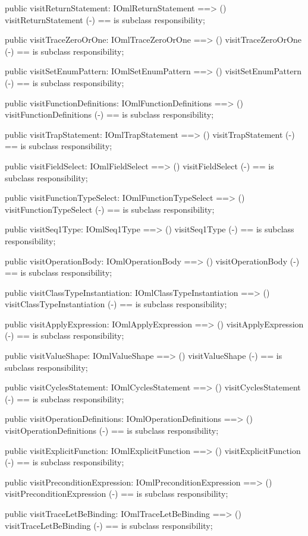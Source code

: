 \begin{vdm_al}
  public visitReturnStatement: IOmlReturnStatement ==> ()
  visitReturnStatement (-) == is subclass responsibility;

  public visitTraceZeroOrOne: IOmlTraceZeroOrOne ==> ()
  visitTraceZeroOrOne (-) == is subclass responsibility;

  public visitSetEnumPattern: IOmlSetEnumPattern ==> ()
  visitSetEnumPattern (-) == is subclass responsibility;

  public visitFunctionDefinitions: IOmlFunctionDefinitions ==> ()
  visitFunctionDefinitions (-) == is subclass responsibility;

  public visitTrapStatement: IOmlTrapStatement ==> ()
  visitTrapStatement (-) == is subclass responsibility;

  public visitFieldSelect: IOmlFieldSelect ==> ()
  visitFieldSelect (-) == is subclass responsibility;

  public visitFunctionTypeSelect: IOmlFunctionTypeSelect ==> ()
  visitFunctionTypeSelect (-) == is subclass responsibility;

  public visitSeq1Type: IOmlSeq1Type ==> ()
  visitSeq1Type (-) == is subclass responsibility;

  public visitOperationBody: IOmlOperationBody ==> ()
  visitOperationBody (-) == is subclass responsibility;

  public visitClassTypeInstantiation: IOmlClassTypeInstantiation ==> ()
  visitClassTypeInstantiation (-) == is subclass responsibility;

  public visitApplyExpression: IOmlApplyExpression ==> ()
  visitApplyExpression (-) == is subclass responsibility;

  public visitValueShape: IOmlValueShape ==> ()
  visitValueShape (-) == is subclass responsibility;

  public visitCyclesStatement: IOmlCyclesStatement ==> ()
  visitCyclesStatement (-) == is subclass responsibility;

  public visitOperationDefinitions: IOmlOperationDefinitions ==> ()
  visitOperationDefinitions (-) == is subclass responsibility;

  public visitExplicitFunction: IOmlExplicitFunction ==> ()
  visitExplicitFunction (-) == is subclass responsibility;

  public visitPreconditionExpression: IOmlPreconditionExpression ==> ()
  visitPreconditionExpression (-) == is subclass responsibility;

  public visitTraceLetBeBinding: IOmlTraceLetBeBinding ==> ()
  visitTraceLetBeBinding (-) == is subclass responsibility;


\end{vdm_al}
